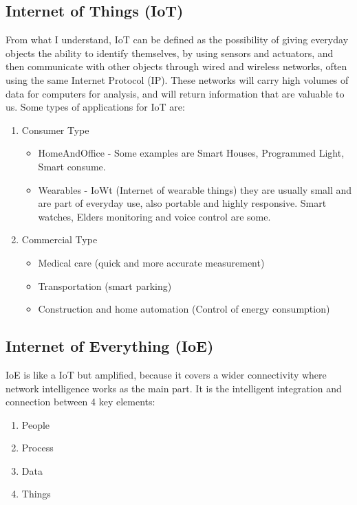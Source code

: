 \documentclass{IEEEtran}
\begin{document}
\subsection{Internet of Things (IoT)}
From what I understand, IoT can be defined as the possibility of giving everyday objects the ability to identify themselves, by using sensors and actuators, 
and then communicate with other objects 
through wired and wireless networks, often using the same Internet Protocol (IP). These networks will carry high volumes of data for computers for analysis, and will 
return information that are valuable to us.
Some types of applications for IoT are:
\begin{enumerate}
     \item Consumer Type
     \begin{itemize}
          \item HomeAndOffice -  Some examples are Smart Houses, Programmed Light, Smart consume.
          \item Wearables - IoWt (Internet of wearable things) they are usually small and are part of everyday use, also portable and highly responsive. 
          Smart watches, Elders monitoring and voice control are some.
     \end{itemize}
     \item Commercial Type
     \begin{itemize}
          \item Medical care (quick and more accurate measurement)
          \item Transportation (smart parking)
          \item Construction and home automation (Control of energy consumption)
     \end{itemize}

\end{enumerate}

\subsection{Internet of Everything (IoE)}
IoE is like a IoT but amplified, because it covers a wider connectivity where network intelligence works as the main part. It is the intelligent integration 
and connection between 4 key elements:
\begin{enumerate}
     \item People
     \item Process
     \item Data 
     \item Things 
\end{enumerate}
\end{document}
